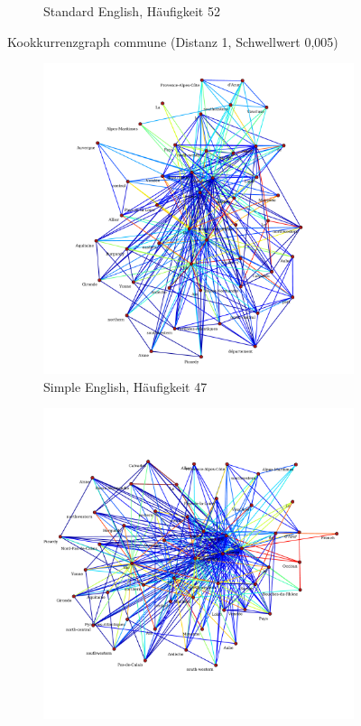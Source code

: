 \documentclass[11pt, a4paper]{article}
\begin{document}
\begin{figure}[hp!]
\begin{subfigure}[b]{0.5\textwidth}
        \caption{Standard English, Häufigkeit 52}
    \end{subfigure}
    \caption{Kookkurrenzgraph commune (Distanz 1, Schwellwert 0,005)}
    \label{fig:hw-commune}
\end{figure}

\begin{figure}[hp!]
    \centering
    \begin{subfigure}[b]{0.5\textwidth}
        \includegraphics[scale=.25]{../../data/results/cooc_wiki_sim/topwords-t0005/graph_France.pdf}
        \caption{Simple English, Häufigkeit 47}
    \end{subfigure}
    \begin{subfigure}[b]{0.5\textwidth}
        \includegraphics[scale=.25]{../../data/results/cooc_wiki_en/topwords-t0005/graph_France.pdf}

\end{subfigure}
\end{figure}
\end{document}
